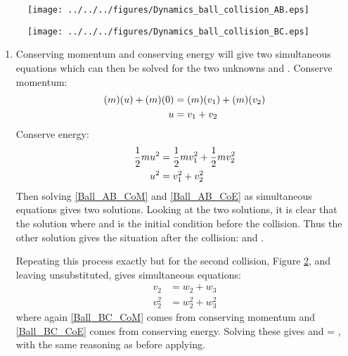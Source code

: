 \begin{problem}[A1969AMIIQ8l]
{\begin{figure}[h]
  \centering
 	\texttt{[image: ../../../figures/Dynamics\_ball\_collision\_AB.eps]}
	\caption{}
	\label{fig:Dynamics_ball_collision_AB}
\end{figure}
\begin{figure}[h]
	\centering
	\texttt{[image: ../../../figures/Dynamics\_ball\_collision\_BC.eps]}
	\caption{}
	\label{fig:Dynamics_ball_collision_BC}
\caption{}
\end{figure}

\begin{enumerate}
	\item Conserving momentum and conserving energy will give two simultaneous equations which can then be solved for the two unknowns  and .
Conserve momentum:
\begin{align} \notag 
(m)(u) + (m)(0) &= (m)(v_{1}) + (m)(v_{2}) \\ u &= v_{1} + v_{2} \label{Ball_AB_CoM}
\end{align}
Conserve energy:
\begin{align} \notag 
\frac{1}{2}mu^{2} &= \frac{1}{2}mv_{1}^{2} + \frac{1}{2}mv_{2}^{2} \\ u^{2} &= v_{1}^{2} + v_{2}^{2} \label{Ball_AB_CoE}
\end{align}
Then solving \ref{Ball_AB_CoM} and \ref{Ball_AB_CoE} as simultaneous equations gives two solutions. Looking at the two solutions, it is clear that the solution where  and  is the initial condition before the collision. Thus the other solution gives the situation after the collision:  and .

Repeating this process exactly but for the second collision, Figure \ref{fig:Dynamics_ball_collision_BC}, and leaving  unsubstituted, gives simultaneous equations:
\begin{align} 
v_{2} &= w_{2} + w_{3} \label{Ball_BC_CoM} \\  
v_{2}^{2} &= w_{2}^{2} + w_{3}^{2} \label{Ball_BC_CoE}
\end{align}
where again \ref{Ball_BC_CoM} comes from conserving momentum and \ref{Ball_BC_CoE} comes from conserving energy. Solving these gives  and  = , with the same reasoning as before applying.


\end{enumerate}}
\end{problem}
